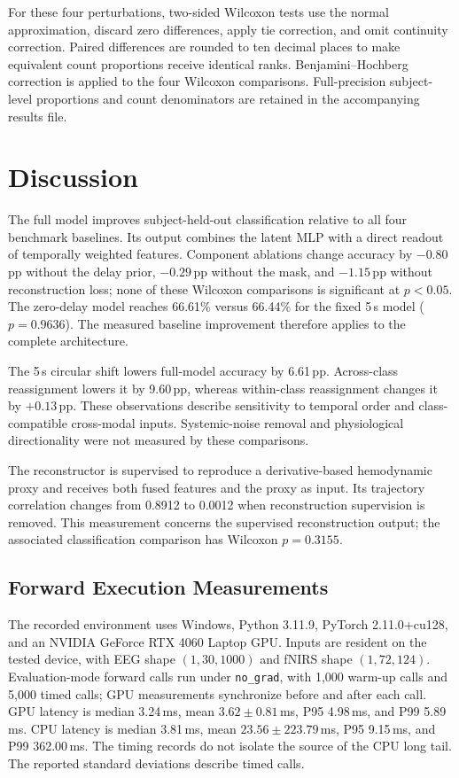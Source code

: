 \documentclass[journal]{IEEEtran}
\begin{document}
For these four perturbations, two-sided Wilcoxon tests use the normal approximation, discard zero differences, apply tie correction, and omit continuity correction. Paired differences are rounded to ten decimal places to make equivalent count proportions receive identical ranks. Benjamini--Hochberg correction is applied to the four Wilcoxon comparisons. Full-precision subject-level proportions and count denominators are retained in the accompanying results file.

\section{Discussion}
The full model improves subject-held-out classification relative to all four benchmark baselines. Its output combines the latent MLP with a direct readout of temporally weighted features. Component ablations change accuracy by $-0.80$\,pp without the delay prior, $-0.29$\,pp without the mask, and $-1.15$\,pp without reconstruction loss; none of these Wilcoxon comparisons is significant at $p<0.05$. The zero-delay model reaches 66.61\% versus 66.44\% for the fixed 5\,s model ($p=0.9636$). The measured baseline improvement therefore applies to the complete architecture.

The 5\,s circular shift lowers full-model accuracy by 6.61\,pp. Across-class reassignment lowers it by 9.60\,pp, whereas within-class reassignment changes it by $+0.13$\,pp. These observations describe sensitivity to temporal order and class-compatible cross-modal inputs. Systemic-noise removal and physiological directionality were not measured by these comparisons.

The reconstructor is supervised to reproduce a derivative-based hemodynamic proxy and receives both fused features and the proxy as input. Its trajectory correlation changes from 0.8912 to 0.0012 when reconstruction supervision is removed. This measurement concerns the supervised reconstruction output; the associated classification comparison has Wilcoxon $p=0.3155$.

\subsection{Forward Execution Measurements}
The recorded environment uses Windows, Python 3.11.9, PyTorch 2.11.0+cu128, and an NVIDIA GeForce RTX 4060 Laptop GPU. Inputs are resident on the tested device, with EEG shape $(1,30,1000)$ and fNIRS shape $(1,72,124)$. Evaluation-mode forward calls run under \texttt{no\_grad}, with 1,000 warm-up calls and 5,000 timed calls; GPU measurements synchronize before and after each call. GPU latency is median 3.24\,ms, mean $3.62\pm0.81$\,ms, P95 4.98\,ms, and P99 5.89\,ms. CPU latency is median 3.81\,ms, mean $23.56\pm223.79$\,ms, P95 9.15\,ms, and P99 362.00\,ms. The timing records do not isolate the source of the CPU long tail. The reported standard deviations describe timed calls.
\end{document}
